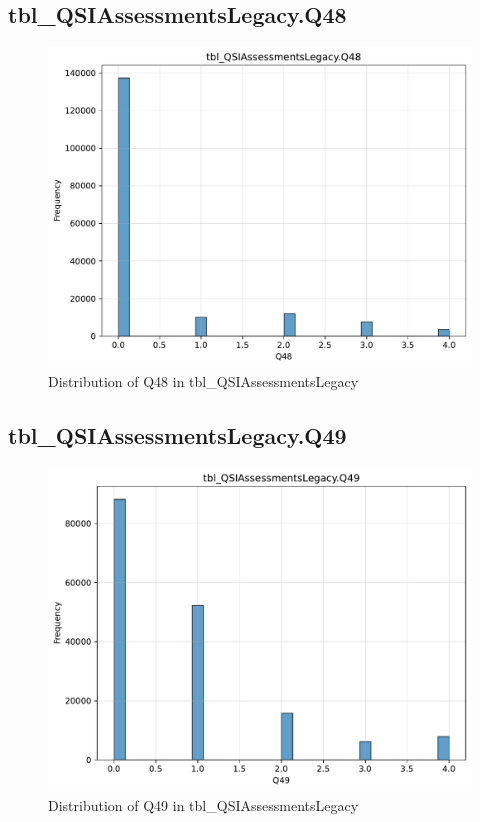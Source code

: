 \subsection{tbl\_QSIAssessmentsLegacy.Q48}

\begin{figure}[htbp]
\centering
\includegraphics[width=\textwidth]{figures/dbo_tbl_QSIAssessmentsLegacy_Q48.pdf}
\caption{Distribution of Q48 in tbl\_QSIAssessmentsLegacy}
\end{figure}\newpage

\subsection{tbl\_QSIAssessmentsLegacy.Q49}

\begin{figure}[htbp]
\centering
\includegraphics[width=\textwidth]{figures/dbo_tbl_QSIAssessmentsLegacy_Q49.pdf}
\caption{Distribution of Q49 in tbl\_QSIAssessmentsLegacy}
\end{figure}\newpage

